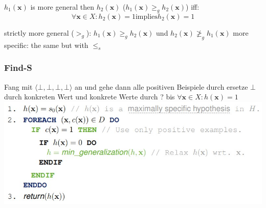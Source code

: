 \documentclass[11pt,a4paper]{article}
\begin{document}
\begin{flushleft}
$h_1(\textbf{x})$ is more general then $h_2(\textbf{x})$ ($h_1(\textbf{x})\geq_g h_2(\textbf{x})$) iff: 
$$ \forall \textbf{x} \in X: h_2(\textbf{x})=1 \text{implies} h_2(\textbf{x})=1 $$
 
strictly more general ($>_g$): $h_1(\textbf{x})\geq_g h_2(\textbf{x})$ und $h_2(\textbf{x})\ngeq_g h_1(\textbf{x})$
more specific: the same but with $\leq_s $ 
 
\subsubsection{Find-S}
Fang mit $ \langle \bot,\bot, \bot, \bot \rangle $ an und gehe dann alle positiven Beispiele durch
ersetze $ \bot $ durch konkreten Wert und konkrete Werte durch ? bis $\forall \textbf{x} \in X : h(\textbf{x})= 1$ 
\includegraphics[width=\textwidth]{FindS}


\end{flushleft}
\end{document}
